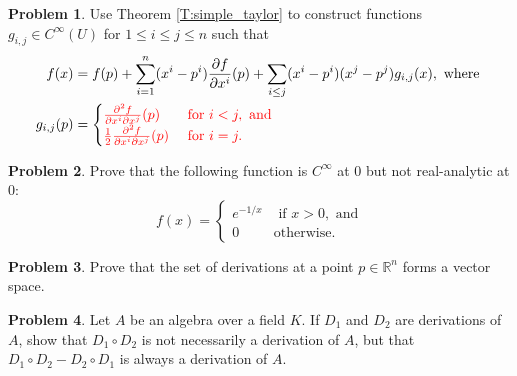\documentclass{amsart}
\newcommand{\+}[1]{\ensuremath{\mathbf{#1}}}
\newcommand{\R}{{\mathbb R}}
\theoremstyle{definition}
\newtheorem{prob}{Problem}
\begin{document}
\begin{prob}
Use Theorem \ref{T:simple_taylor} to construct functions $g_{i,j} \in C^{\infty}(U)$ for 
  $1 \leq i \leq j \leq n$ such that 
  \begin{align*}
 f(x) &= f(p) + \sum^n_{i=1} (x^i - p^i)\frac{\partial f}{\partial x^i}(p) + 
 \sum_{i \leq j} (x^i - p^i)(x^j - p^j)g_{i,j}(x), \text{ where }  \\
 g_{i,j}(p) &= 
 \begin{cases}
 \color{red}\frac{\partial^2 f}{\partial x^i \partial x^j} (p) &\color{red}\text{ for } i < j, \text{ and} \\
 \color{red}\frac{1}{2}\frac{\partial^2 f}{\partial x^i \partial x^j} (p) &\color{red}\text{ for } i = j.
 \end{cases}
\end{align*}
\end{prob}

\begin{prob}
 Prove that the following function is $C^\infty$ at $0$ but not real-analytic at $0$:
 \begin{equation*}
  f(x) =
  \begin{cases}
   e^{-1/x} &\text{ if } x > 0, \text{ and} \\
   0 &\text{otherwise}.
  \end{cases}
 \end{equation*}
\end{prob}

\begin{prob}
 Prove that the set of derivations at a point $p \in \R^n$ forms a vector space.
\end{prob}

\begin{prob}
Let $A$ be an algebra over a field $K$.  If $D_1$ and $D_2$ are derivations
of $A$, show that $D_1 \circ D_2$ is not necessarily a derivation of $A$, but that
$D_1 \circ D_2 - D_2 \circ D_1$ is always a derivation of $A$.
\end{prob}
\end{document}
